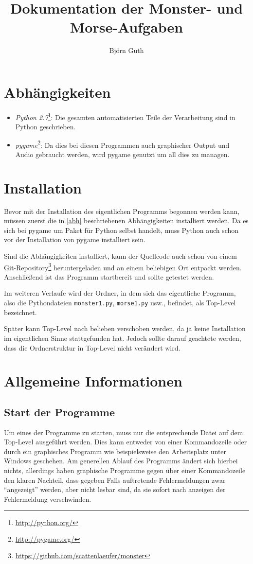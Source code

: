 \documentclass[a4paper]{scrartcl}
\author{Bj\"orn Guth}
\title{Dokumentation der Monster- und Morse-Aufgaben}
\newtheorem[M]{thmL}{Definition}
\begin{document}
\maketitle

\section{Abhängigkeiten}
\label{abh}
\begin{itemize}
	\item \emph{Python 2.7}\footnote{\url{http://python.org/}}: Die gesamten automatisierten Teile der Verarbeitung sind in Python geschrieben.
	\item \emph{pygame}\footnote{\url{http://pygame.org/}}: Da dies bei diesen Programmen auch graphischer Output und Audio gebraucht werden, wird pygame genutzt um all dies zu managen.
\end{itemize}

\section{Installation}
Bevor mit der Installation des eigentlichen Programms begonnen werden kann, müssen zuerst die in \autoref{abh} beschriebenen Abhängigkeiten installiert werden. Da es sich bei pygame um Paket für Python selbst handelt, muss Python auch schon vor der Installation von pygame installiert sein.

Sind die Abhängigkeiten installiert, kann der Quellcode auch schon von einem Git-Repository\footnote{\url{https://github.com/scattenlaeufer/monster}} heruntergeladen und an einem beliebigen Ort entpackt werden. Anschließend ist das Programm startbereit und sollte getestet werden.
\begin{thmL}
	Im weiteren Verlaufe wird der Ordner, in dem sich das eigentliche Programm, also die Pythondateien \verb+monster1.py+, \verb+morse1.py+ usw., befindet, als Top-Level bezeichnet.
\end{thmL}
Später kann Top-Level nach belieben verschoben werden, da ja keine Installation im eigentlichen Sinne stattgefunden hat. Jedoch sollte darauf geachtete werden, dass die Ordnerstruktur in Top-Level nicht verändert wird.

\section{Allgemeine Informationen}

\subsection{Start der Programme} \label{start}
Um eines der Programme zu starten, muss nur die entsprechende Datei auf dem Top-Level ausgeführt werden. Dies kann entweder von einer Kommandozeile oder durch ein graphisches Programm wie beispielsweise den Arbeitsplatz unter Windows geschehen. Am generellen Ablauf des Programms ändert sich hierbei nichts, allerdings haben graphische Programme gegen über einer Kommandozeile den klaren Nachteil, dass gegeben Falls auftretende Fehlermeldungen zwar "`angezeigt"' werden, aber nicht lesbar sind, da sie sofort nach anzeigen der Fehlermeldung verschwinden.
\end{document}
